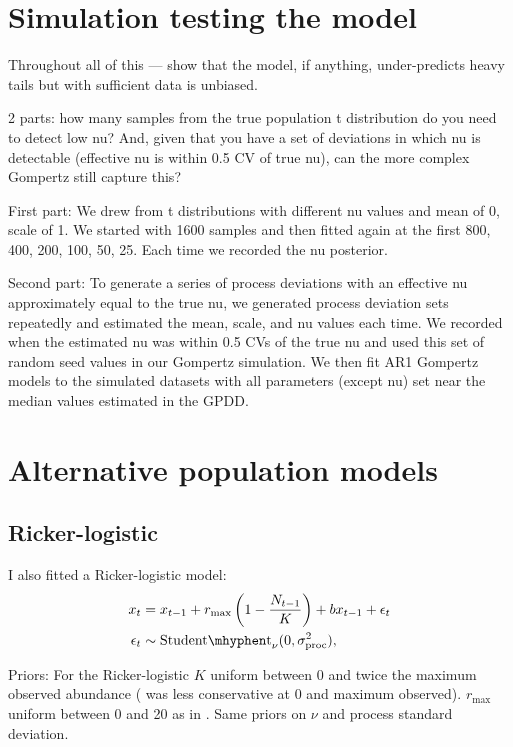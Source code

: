 \documentclass[11pt]{article}
\begin{document}
\section{Simulation testing the model}

Throughout all of this --- show that the model, if anything, under-predicts heavy tails but with sufficient data is unbiased.

2 parts: how many samples from the true population t distribution do you need to detect low nu? And, given that you have a set of deviations in which nu is detectable (effective nu is within 0.5 CV of true nu), can the more complex Gompertz still capture this?

First part: We drew from t distributions with different nu values and mean of 0, scale of 1. We started with 1600 samples and then fitted again at the first 800, 400, 200,  100, 50, 25. Each time we recorded the nu posterior.

Second part: To generate a series of process deviations with an effective nu approximately equal to the true nu, we generated process deviation sets repeatedly and estimated the mean, scale, and nu values each time. We recorded when the estimated nu was within 0.5 CVs of the true nu and used this set of random seed values in our Gompertz simulation. We then fit AR1 Gompertz models to the simulated datasets with all parameters (except nu) set near the median values estimated in the GPDD.

\section{Alternative population models}

\subsection{Ricker-logistic}

I also fitted a Ricker-logistic model:
\begin{align*}
x_t &= x_{t-1} + r_{\mathrm{max}}\left(1 - \frac{N_{t-1}}{K}\right) + b x_{t-1} + \epsilon_t\\
\epsilon_t &\sim \mathrm{Student\mhyphen t}_\nu(0, \sigma_\mathrm{proc}^2),
\end{align*}


Priors: For the Ricker-logistic $K$ uniform between 0 and twice the maximum observed abundance (\citet{clark2010} was less conservative at 0 and maximum observed). $r_\mathrm{max}$ uniform between 0 and 20 as in \citet{clark2010}. Same priors on $\nu$ and process standard deviation.
\end{document}
